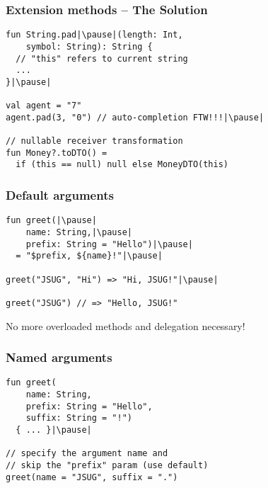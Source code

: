 \begin{frame}[fragile] \frametitle{Extension methods -- The Solution}
\pause
\begin{lstlisting}
fun String.pad|\pause|(length: Int,
    symbol: String): String {
  // "this" refers to current string
  ...
}|\pause|

val agent = "7"
agent.pad(3, "0") // auto-completion FTW!!!|\pause|

// nullable receiver transformation
fun Money?.toDTO() =
  if (this == null) null else MoneyDTO(this)
\end{lstlisting}
\end{frame}



\begin{frame}[fragile] \frametitle{Default arguments}
\pause
\begin{lstlisting}
fun greet(|\pause|
    name: String,|\pause|
    prefix: String = "Hello")|\pause|
  = "$prefix, ${name}!"|\pause|

greet("JSUG", "Hi") => "Hi, JSUG!"|\pause|

greet("JSUG") // => "Hello, JSUG!"
\end{lstlisting}

No more overloaded methods and delegation necessary!
\end{frame}


\begin{frame}[fragile] \frametitle{Named arguments}
\pause
\begin{lstlisting}
fun greet(
    name: String,
    prefix: String = "Hello",
    suffix: String = "!")
  { ... }|\pause|

// specify the argument name and
// skip the "prefix" param (use default)
greet(name = "JSUG", suffix = ".")
\end{lstlisting}
\end{frame}



